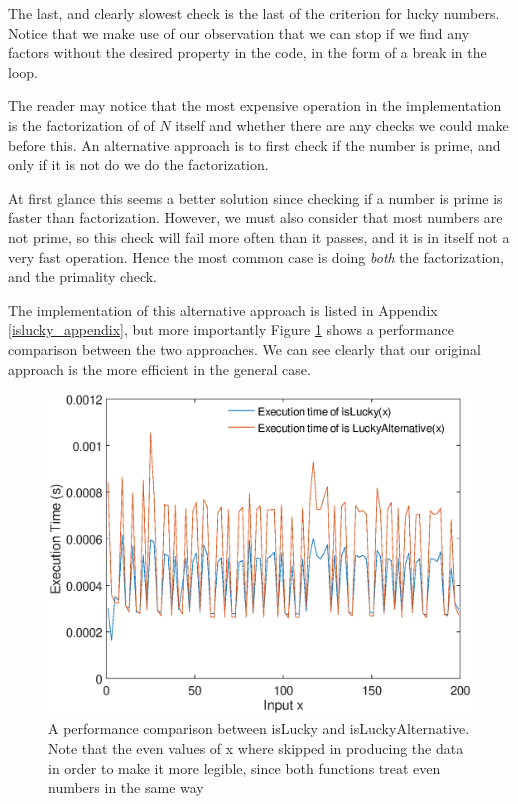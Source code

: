 \documentclass[10pt]{article}
\begin{document}
The last, and clearly slowest check is the last  of the criterion for lucky numbers. Notice that we make use of our observation that we can stop if we find any factors without the desired property in the code, in the form of a break in the loop.

The reader may notice that the most expensive operation in the implementation is the factorization of of $N$ itself and whether there are any checks we could make before this. An alternative approach is to first check if the number is prime, and only if it is not do we do the factorization. 

At first glance this seems a better solution since checking if a number is prime is faster than factorization. However, we must also consider that most numbers are not prime, so this check will fail more often than it passes, and it is in itself not a very fast operation. Hence the most common case is doing \emph{both} the factorization, and the primality check.

The implementation of this alternative approach is listed in Appendix \ref{islucky_appendix}, but more importantly Figure \ref{isluckytest} shows a performance comparison between the two approaches. We can see clearly that our original approach is the more efficient in the general case.

\begin{center}
\begin{figure}

   \includegraphics[scale=0.6]{islucky_test.eps}

   \caption{A performance comparison between isLucky and isLuckyAlternative. Note that the even values of x where skipped in producing the data in order to make it more legible, since both functions treat even numbers in the same way}
      \label{isluckytest}
\end{figure}
\end{center}
\end{document}
